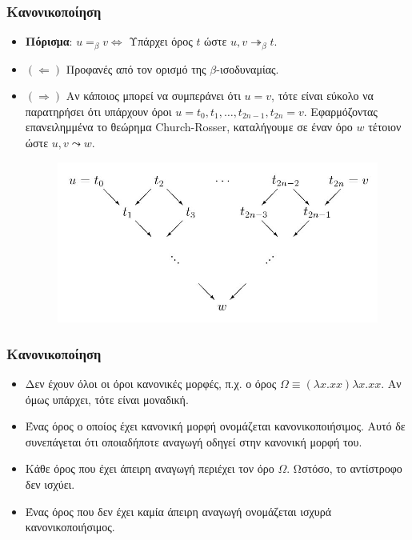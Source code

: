 \documentclass{beamer}
\begin{document}
\begin{frame}
\frametitle{Κανονικοποίηση}
\begin{itemize}
\item \textbf{Πόρισμα}:  $u =_\beta v \Leftrightarrow$ Υπάρχει όρος $t$ ώστε $u, v \twoheadrightarrow _\beta t$.\pause
\item $(\Leftarrow)$ Προφανές από τον ορισμό της $\beta$-ισοδυναμίας.\pause
\item $(\Rightarrow)$ Aν  κάποιος μπορεί να συμπεράνει ότι $u = v$, τότε είναι εύκολο να παρατηρήσει ότι υπάρχουν όροι $u = t_0, t_1,\ldots, t_{2n-1}, t_{2n} = v$. Εφαρμόζοντας επανειλημμένα το θεώρημα Church-Rosser, καταλήγουμε σε έναν όρο	$w$ τέτοιον ώστε $u, v \leadsto w$.\pause
\begin{figure} [!ht]
\centering
\includegraphics[scale=0.3] {CR1.jpg}
\end{figure}
\end{itemize}
\end{frame}

\begin{frame}
\frametitle{Κανονικοποίηση}
\begin{itemize}
\item Δεν έχουν όλοι οι όροι κανονικές μορφές, π.χ. ο όρος $\Omega \equiv  (\lambda x . xx) \lambda x . xx$. Αν όμως υπάρχει, τότε είναι μοναδική. \pause
\item Ένας όρος ο οποίος έχει κανονική μορφή ονομάζεται κανονικοποιήσιμος. Αυτό δε συνεπάγεται ότι οποιαδήποτε αναγωγή οδηγεί στην κανονική μορφή του. \pause
\item Κάθε όρος που έχει άπειρη αναγωγή περιέχει τον όρο $\Omega$. Ωστόσο, το αντίστροφο δεν ισχύει.\pause
\item Ένας όρος που δεν έχει καμία άπειρη αναγωγή ονομάζεται ισχυρά κανονικοποιήσιμος. 
\end{itemize}
\end{frame}
\end{document}
